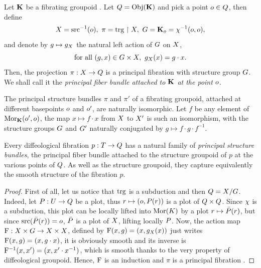 \begin{article}
  \label{Principal-bundle-attached-to-a-fibrating-groupoid}
  Let $\KK$ be a fibrating groupoid .
  Let $\Q = \Obj(\KK)$ and pick a point $\eo \in \Q$,
  then define
  $$%
  \X = \source^{-1}(\eo), \  \pi = \target \restriction \X, \ \G = \KK_{\eo} = \car^{-1}(\eo,\eo),
  $$%
  and denote by $g \mapsto g_\X$ the natural left action of $\G$ on $\X$,
  $$%
  \text{for all } (g,x) \in \G \times \X, \  g_\X(x) = g \cdot x.
  $$%
  Then,
  the projection $\pi : \X \to \Q$ is a principal fibration with structure group $\G$.
  We shall call it the {\em principal fiber bundle attached  to $\KK$ at the point $\eo$}.
  
   The principal structure bundles $\pi$ and $\pi'$ of a fibrating groupoid,
  attached at different basepoints $\eo$ and $\eo'$,
  are naturally isomorphic.
  Let $f$ be any element of $\Mor_\KK(\eo',\eo)$,
  the map $x \mapsto f \cdot x$ from $\X$ to $\X'$ is such an isomorphism,
  with the structure groups $\G$ and $\G'$ naturally conjugated by $ g \mapsto f \cdot g \cdot f^{-1}$.
  
   Every diffeological fibration $p : \T \to \Q$ has a natural family of {\em principal structure bundles},
  the principal fiber bundle attached to the structure groupoid of $p$  at the various points of $\Q$.
  As well as the structure groupoid,
  they capture equivalently the smooth structure of the fibration $p$.
\end{article} %

\begin{proof}
  First of all,
  let us notice that $\target$ is a subduction and then $\Q = \quotient{\X}{\G}$.
  Indeed,
  let $\P : \U \to \Q$ be a plot,
  thus $r \mapsto (\eo, \P(r))$ is a plot of $\Q \times \Q$.
  Since $\car$ is a subduction,
  this plot can be locally lifted into $\Mor(\K)$ by a plot $r \mapsto \bar\P(r)$,
  but since $\source(\bar\P(r)) = \eo$,
  $\bar\P$ is a plot of $\X$,
  lifting locally $\P$.
  Now,
  the action map $\eF : \X \times \G \to \X \times \X$,
  defined by $\eF(x,g) = (x,g_\X(x))$ just writes $\eF(x,g) = (x, g \cdot x)$,
  it is obviously smooth and its inverse is $\eF^{-1}(x,x') = (x, x' \cdot x^{-1})$,
  which is smooth thanks to the very property of diffeological groupoid.
  Hence,
  $\eF$ is an induction and $\pi$ is a principal fibration .
\end{proof}

